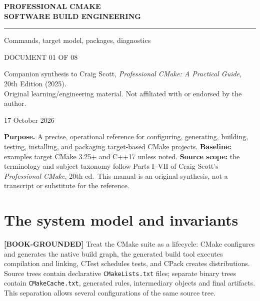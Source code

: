 \documentclass[11pt,letterpaper,oneside]{report}
\providecommand{\passthrough}[1]{#1}
\begin{document}
\hypersetup{pageanchor=false}\begin{titlepage}
\color{navy}
\vspace*{1.15in}
{\Large\bfseries PROFESSIONAL CMAKE\\[7pt]SOFTWARE BUILD ENGINEERING\par}
\vspace{0.32in}\noindent\textcolor{teal}{\rule{0.9\linewidth}{2.3pt}}\par
\vspace{0.45in}
\par
\vspace{0.3in}
{\Large\color{teal}Commands, target model, packages, diagnostics\par}
\vfill
{\large DOCUMENT 01 OF 08\par}
\vspace{0.1in}
{\small Companion synthesis to Craig Scott, \emph{Professional CMake: A Practical Guide}, 20th Edition (2025).\\
Original learning/engineering material. Not affiliated with or endorsed by the author.\par}
\vspace{0.2in}
{\small 17 October 2026\par}
\end{titlepage}
\hypersetup{pageanchor=true}\clearpage{}\tableofcontents\clearpage{}

\textbf{Purpose.} A precise, operational reference for configuring,
generating, building, testing, installing, and packaging target-based
CMake projects. \textbf{Baseline:} examples target CMake 3.25+ and C++17
unless noted. \textbf{Source scope:} the terminology and subject
taxonomy follow Parts I--VII of Craig Scott's \emph{Professional CMake},
20th ed.~This manual is an original synthesis, not a transcript or
substitute for the reference.

\chapter{The system model and
invariants}\label{the-system-model-and-invariants}

\textbf{{[}BOOK-GROUNDED{]}} Treat the CMake suite as a lifecycle: CMake
configures and generates the native build graph, the generated build
tool executes compilation and linking, CTest schedules tests, and CPack
creates distributions. Source trees contain declarative
\passthrough{\lstinline!CMakeLists.txt!} files; separate binary trees
contain \passthrough{\lstinline!CMakeCache.txt!}, generated rules,
intermediary objects and final artifacts. This separation allows several
configurations of the same source tree.
\end{document}
